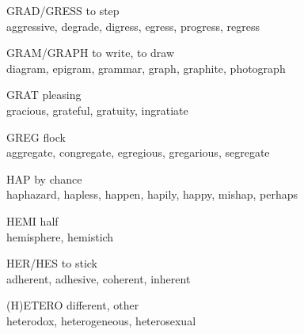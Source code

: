 \begin{flashcard}[Roots]{GRAD/GRESS}
to step\\
\vspace{0.2in}
aggressive, degrade, digress, egress, progress, regress\\
\end{flashcard}

\begin{flashcard}[Roots]{GRAM/GRAPH}
to write, to draw\\
\vspace{0.2in}
diagram, epigram, grammar, graph, graphite, photograph\\
\end{flashcard}

\begin{flashcard}[Roots]{GRAT}
pleasing\\
\vspace{0.2in}
gracious, grateful, gratuity, ingratiate\\
\end{flashcard}

\begin{flashcard}[Roots]{GREG}
flock\\
\vspace{0.2in}
aggregate, congregate, egregious, gregarious, segregate\\
\end{flashcard}

\begin{flashcard}[Roots]{HAP}
by chance\\
\vspace{0.2in}
haphazard, hapless, happen, hapily, happy, mishap, perhaps\\
\end{flashcard}

\begin{flashcard}[Roots]{HEMI}
half\\
\vspace{0.2in}
hemisphere, hemistich\\
\end{flashcard}

\begin{flashcard}[Roots]{HER/HES}
to stick\\
\vspace{0.2in}
adherent, adhesive, coherent, inherent\\
\end{flashcard}

\begin{flashcard}[Roots]{(H)ETERO}
different, other\\
\vspace{0.2in}
heterodox, heterogeneous, heterosexual\\
\end{flashcard}

